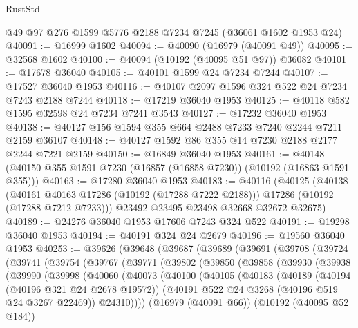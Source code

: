 \begin{lexlean}{RustStd}
\begin{coremodule}
    @49
    @97
    @276
    @1599
    @5776
    @2188
    @7234
    @7245
    (@36061 @1602 @1953 @24)
@40091 := @16999 @1602
@40094 := @40090 (@16979 (@40091 @49))
@40095 := @32568 @1602
@40100 := @40094 (@10192 (@40095 @51 @97)) @36082
@40101 := @17678 @36040
@40105 := @40101 @1599 @24 @7234 @7244
@40107 := @17527 @36040 @1953
@40116 := @40107 @2097 @1596 @324 @522 @24 @7234 @7243 @2188 @7244
@40118 := @17219 @36040 @1953
@40125 := @40118 @582 @1595 @32598 @24 @7234 @7241 @3543
@40127 := @17232 @36040 @1953
@40138 := @40127 @156 @1594 @355 @664 @2488 @7233 @7240 @2244 @7211 @2159 @36107
@40148 := @40127 @1592 @86 @355 @14 @7230 @2188 @2177 @2244 @7221 @2159
@40150 := @16849 @36040 @1953
@40161 := @40148 (@40150 @355 @1591 @7230 (@16857 (@16858 @7230)) (@10192 (@16863 @1591 @355)))
@40163 := @17280 @36040 @1953
@40183 := @40116
    (@40125
      (@40138
        (@40161 @40163 @17286 (@10192 (@17288 @7222 @2188)))
        @17286
        (@10192 (@17288 @7212 @7233)))
      @23492
      @23495
      @23498
      @32668
      @32672
      @32675)
@40189 := @24276 @36040 @1953 @17606 @7243 @324 @522
@40191 := @19298 @36040 @1953
@40194 := @40191 @324 @24 @2679
@40196 := @19560 @36040 @1953
@40253 := @39626
    (@39648
      (@39687
        (@39689
          (@39691
            (@39708
              (@39724
                (@39741
                  (@39754
                    (@39767
                      (@39771
                        (@39802
                          (@39850
                            (@39858
                              (@39930
                                (@39938
                                  (@39990
                                    (@39998
                                      (@40060
                                        (@40073
                                          (@40100
                                            (@40105
                                              (@40183
                                                (@40189
                                                  (@40194 (@40196 @321 @24 @2678 @19572))
                                                  (@40191
                                                    @522
                                                    @24
                                                    @3268
                                                    (@40196 @519 @24 @3267 @22469))
                                                  @24310))))
                                          (@16979 (@40091 @66))
                                          (@10192 (@40095 @52 @184))

\end{coremodule}
\end{lexlean}
